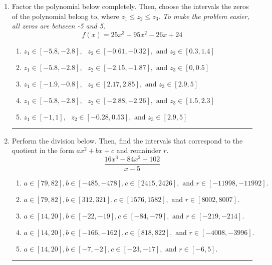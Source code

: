 \documentclass[14pt]{extbook}
\newcommand{\litem}[1]{\item#1\hspace*{-1cm}\rule{\textwidth}{0.4pt}}
\begin{document}
\begin{enumerate}
{\begin{enumerate}[label=\Alph*.]
\end{enumerate} }
\litem{
Factor the polynomial below completely. Then, choose the intervals the zeros of the polynomial belong to, where $z_1 \leq z_2 \leq z_3$. \textit{To make the problem easier, all zeros are between -5 and 5.}\[ f(x) = 25x^{3} -95 x^{2} -26 x + 24 \]\begin{enumerate}[label=\Alph*.]
\item \( z_1 \in [-5.8, -2.8], \text{   }  z_2 \in [-0.61, -0.32], \text{   and   } z_3 \in [0.3, 1.4] \)
\item \( z_1 \in [-5.8, -2.8], \text{   }  z_2 \in [-2.15, -1.87], \text{   and   } z_3 \in [0, 0.5] \)
\item \( z_1 \in [-1.9, -0.8], \text{   }  z_2 \in [2.17, 2.85], \text{   and   } z_3 \in [2.9, 5] \)
\item \( z_1 \in [-5.8, -2.8], \text{   }  z_2 \in [-2.88, -2.26], \text{   and   } z_3 \in [1.5, 2.3] \)
\item \( z_1 \in [-1, 1], \text{   }  z_2 \in [-0.28, 0.53], \text{   and   } z_3 \in [2.9, 5] \)

\end{enumerate} }
\litem{
Perform the division below. Then, find the intervals that correspond to the quotient in the form $ax^2+bx+c$ and remainder $r$.\[ \frac{16x^{3} -84 x^{2} + 102}{x -5} \]\begin{enumerate}[label=\Alph*.]
\item \( a \in [79, 82], b \in [-485, -478], c \in [2415, 2426], \text{ and } r \in [-11998, -11992]. \)
\item \( a \in [79, 82], b \in [312, 321], c \in [1576, 1582], \text{ and } r \in [8002, 8007]. \)
\item \( a \in [14, 20], b \in [-22, -19], c \in [-84, -79], \text{ and } r \in [-219, -214]. \)
\item \( a \in [14, 20], b \in [-166, -162], c \in [818, 822], \text{ and } r \in [-4008, -3996]. \)
\item \( a \in [14, 20], b \in [-7, -2], c \in [-23, -17], \text{ and } r \in [-6, 5]. \)


\end{enumerate}}
\end{enumerate}
\end{document}
